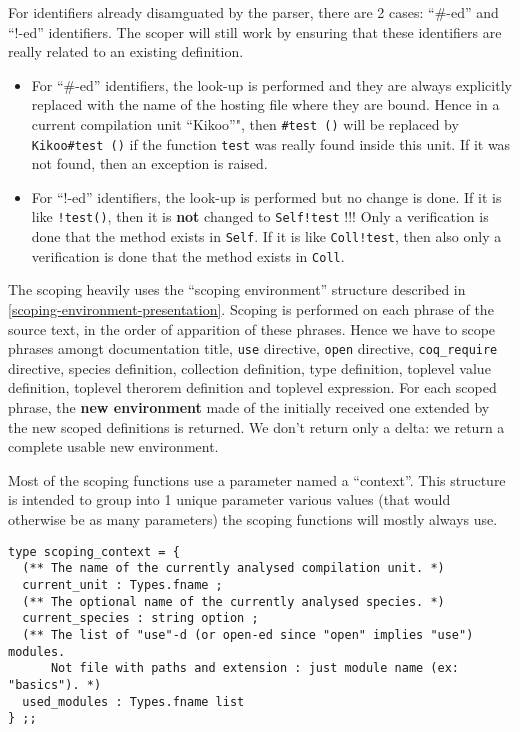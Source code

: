 For identifiers already disamguated by the parser, there are 2 cases:
``\#-ed'' and ``!-ed'' identifiers. The scoper will still work by
ensuring that these identifiers are really related to an existing
definition.
\begin{itemize}
\item For ``\#-ed'' identifiers, the look-up is performed and they are
  always explicitly replaced with the name of the hosting file where
  they are bound. Hence in a current compilation unit ``Kikoo''", then
  {\tt \#test ()} will be replaced by {\tt Kikoo\#test ()} if the
  function {\tt test} was really found inside this unit. If it was not
  found, then an exception is raised.

\item For ``!-ed'' identifiers, the look-up is performed but no change
  is done. If it is like {\tt !test()}, then it is {\bf not} changed to
  {\tt Self!test} !!! Only a verification is done that the method
  exists in {\tt Self}. If it is like {\tt Coll!test}, then also only
  a verification is done that the method exists in {\tt Coll}.
\end{itemize}

The scoping heavily uses the ``scoping environment'' structure
described in \ref{scoping-environment-presentation}. Scoping is
performed on each phrase of the source text, in the order of
apparition of these phrases. Hence we have to scope phrases amongt
documentation title, {\tt use} directive, {\tt open} directive,
{\tt coq\_require} directive, species definition, collection
definition, type definition, toplevel value definition, toplevel
therorem definition and toplevel expression. For each scoped phrase,
the {\bf new environment} made of the initially received one extended
by the new scoped definitions is returned. We don't return only a
delta: we return a complete usable new environment.

Most of the scoping functions use a parameter named a
``context''. This structure is intended to group into 1 unique
parameter various values (that would otherwise be as many parameters)
the scoping functions will mostly always use.
{\footnotesize
\begin{lstlisting}[language=MyOCaml]
type scoping_context = {
  (** The name of the currently analysed compilation unit. *)
  current_unit : Types.fname ;
  (** The optional name of the currently analysed species. *)
  current_species : string option ;
  (** The list of "use"-d (or open-ed since "open" implies "use") modules.
      Not file with paths and extension : just module name (ex: "basics"). *)
  used_modules : Types.fname list
} ;;
\end{lstlisting}
}


